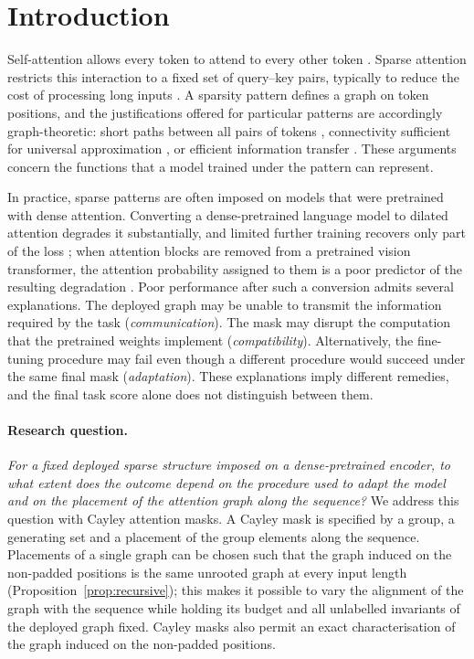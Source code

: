 \documentclass[10pt]{article}
\begin{document}
\section{Introduction}
\label{sec:intro}

Self-attention allows every token to attend to every other token \citep{vaswani2017attention}. Sparse attention restricts this interaction to a fixed set of query--key pairs, typically to reduce the cost of processing long inputs \citep{child2019generating,beltagy2020longformer,zaheer2020bigbird,ainslie2020etc,tay2022efficient}. A sparsity pattern defines a graph on token positions, and the justifications offered for particular patterns are accordingly graph-theoretic: short paths between all pairs of tokens \citep{zaheer2020bigbird,shirzad2023exphormer}, connectivity sufficient for universal approximation \citep{yun2020on}, or efficient information transfer \citep{wang2022dense}. These arguments concern the functions that a model trained under the pattern can represent.

In practice, sparse patterns are often imposed on models that were pretrained with dense attention. Converting a dense-pretrained language model to dilated attention degrades it substantially, and limited further training recovers only part of the loss \citep{wei2026rat}; when attention blocks are removed from a pretrained vision transformer, the attention probability assigned to them is a poor predictor of the resulting degradation \citep{kim2026ress}. Poor performance after such a conversion admits several explanations. The deployed graph may be unable to transmit the information required by the task (\emph{communication}). The mask may disrupt the computation that the pretrained weights implement (\emph{compatibility}). Alternatively, the fine-tuning procedure may fail even though a different procedure would succeed under the same final mask (\emph{adaptation}). These explanations imply different remedies, and the final task score alone does not distinguish between them.

\paragraph{Research question.} \emph{For a fixed deployed sparse structure imposed on a dense-pretrained encoder, to what extent does the outcome depend on the procedure used to adapt the model and on the placement of the attention graph along the sequence?} We address this question with Cayley attention masks. A Cayley mask is specified by a group, a generating set and a placement of the group elements along the sequence. Placements of a single graph can be chosen such that the graph induced on the non-padded positions is the same unrooted graph at every input length (Proposition~\ref{prop:recursive}); this makes it possible to vary the alignment of the graph with the sequence while holding its budget and all unlabelled invariants of the deployed graph fixed. Cayley masks also permit an exact characterisation of the graph induced on the non-padded positions.
\end{document}
